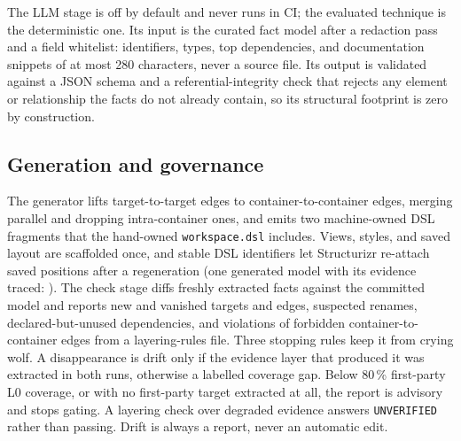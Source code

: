 The LLM stage is off by default and never runs in CI; the evaluated technique is the deterministic
one. Its input is the curated fact model after a redaction pass and a field whitelist:
identifiers, types, top dependencies, and documentation snippets of at most 280 characters, never
a source file. Its output is validated against a JSON schema and a referential-integrity check
that rejects any element or relationship the facts do not already contain, so its structural
footprint is zero by construction.

\subsection{Generation and governance}
\label{sec:generate}

The generator lifts target-to-target edges to container-to-container edges, merging parallel
and dropping intra-container ones, and emits two machine-owned DSL fragments that the
hand-owned \texttt{workspace.dsl} includes. Views, styles, and saved layout are scaffolded once,
and stable DSL identifiers let Structurizr re-attach saved positions after a regeneration (one
generated model with its evidence traced: \trExtract{}). The check stage diffs freshly extracted facts against the committed model and reports new and
vanished targets and edges, suspected renames, declared-but-unused dependencies, and violations of
forbidden container-to-container edges from a layering-rules file. Three stopping rules keep it
from crying wolf. A disappearance is drift only if the evidence layer that produced it was
extracted in both runs, otherwise a labelled coverage gap. Below 80\,\% first-party L0 coverage,
or with no first-party target extracted at all, the report is advisory and stops gating. A layering check over degraded evidence answers \texttt{UNVERIFIED} rather than passing.
Drift is always a report, never an automatic edit.
